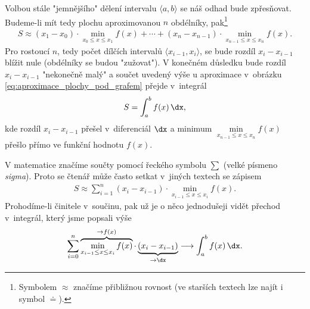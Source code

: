 Volbou stále "jemnějšího" dělení intervalu $\langle a,b \rangle$ se náš odhad bude zpřesňovat. Budeme-li mít tedy plochu aproximovanou $n$ obdélníky, pak\footnote{Symbolem $\approx$ značíme přibližnou rovnost (ve starších textech lze najít i symbol $\doteq$).}
\begin{align}
\label{eq:aproximace_plochy_pod_grafem}
S \approx (x_1-x_0) \cdot \min\limits_{x_{0} \leq x \leq x_1}{f(x)} +\cdots + (x_n-x_{n-1}) \cdot \min\limits_{x_{n-1} \leq x \leq x_n}{f(x)}.
\end{align}
Pro rostoucí $n$, tedy počet dílčích intervalů $\langle x_{i-1},x_i \rangle$, se bude rozdíl $x_i-x_{i-1}$ blížit nule (obdélníky se budou "zužovat"). V konečném důsledku bude rozdíl $x_i-x_{i-1}$ "nekonečně malý" a součet uvedený výše u aproximace v~obrázku \ref{eq:aproximace_plochy_pod_grafem} přejde v~integrál
\begin{align*}
S=\int_{a}^{b}{f(x)\,\dx},
\end{align*}
kde rozdíl $x_i-x_{i-1}$ přešel v~diferenciál $\dx$ a minimum $\min\limits_{x_{n-1} \leq x \leq x_n}{f(x)}$ přešlo přímo ve funkční hodnotu $f(x)$.\par
V matematice značíme součty pomocí řeckého symbolu $\sum$ (velké písmeno \emph{sigma}). Proto se čtenář může často setkat v~jiných textech se zápisem
\begin{align*}
S \approx \sum_{i=1}^{n}{(x_i-x_{i-1}) \cdot \min\limits_{x_{i-1} \leq x \leq x_i}{f(x)}}.
\end{align*}
Prohodíme-li činitele v~součinu, pak už je o něco jednodušeji vidět přechod v~integrál, který jsme popsali výše
\begin{align*}
\sum_{i=0}^{n}{\overbrace{\min\limits_{x_{i-1} \leq x \leq x_i}{f(x)}}^{\rightarrow f(x)} \cdot \underbrace{(x_i-x_{i-1})}_{\rightarrow \dx}} \longrightarrow \int_{a}^{b}{f(x)\,\dx}.
\end{align*}

